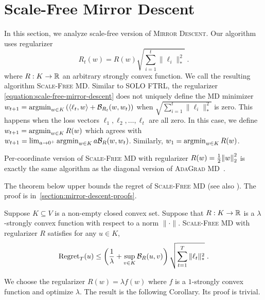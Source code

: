 \section{Scale-Free Mirror Descent}
\label{section:mirror-descent}

In this section, we analyze scale-free version of \textsc{Mirror Descent}.
Our algorithm uses regularizer
\begin{equation}
\label{equation:scale-free-mirror-descent}
R_t(w) = R(w) \sqrt{\sum_{i=1}^t \|\ell_i\|_*^2} \; .
\end{equation}
where $R:K \to \mathbb{R}$ an arbitrary strongly convex function.
We call the resulting algorithm \textsc{Scale-Free MD}.
Similar to \textsc{SOLO FTRL}, the regularizer
\eqref{equation:scale-free-mirror-descent} does not uniquely define
the \textsc{MD} minimizer
$w_{t+1} = \operatorname*{argmin}_{w \in K} \left(\langle \ell_t, w \rangle + \mathcal{B}_{R_t}(w,
w_t) \right)$ when $\sqrt{\sum_{i=1}^t \|\ell_i\|_*^2}$ is zero.
This happens when the loss vectors $\ell_1, \ell_2, \dots, \ell_t$ are all
zero. In this case, we define
$w_{t+1} = \operatorname*{argmin}_{w \in K} R(w)$ which agrees with
$w_{t+1} = \lim_{a \to 0^+} \operatorname*{argmin}_{w \in K} a \mathcal{B}_{R}(w, w_t)$.
Similarly, $w_1 = \operatorname*{argmin}_{w \in K} R(w)$.

Per-coordinate version of \textsc{Scale-Free MD} with regularizer $R(w) =
\frac{1}{2}{\left\|{w}\right\|}_2^2$ is exactly the same algorithm as the diagonal version
of \textsc{AdaGrad MD}~\cite{Duchi-Hazan-Singer-2011}.

The theorem below upper bounds the regret of \textsc{Scale-Free MD} (see also
\cite{Duchi-Hazan-Singer-2011, Duchi-Shalev-Shwartz-Singer-Tewari-2010,
Rakhlin-Sridharan-2013}).  The proof is in~\ref{section:mirror-descent-proofs}.

\begin{theorem}
\label{theorem:regret-scale-free-mirror-descent}
Suppose $K \subseteq V$ is a non-empty closed convex set. Suppose that $R:K
\to \mathbb{R}$ is a $\lambda$-strongly convex function with respect to a norm
$\|\cdot\|$.  \textsc{Scale-Free MD} with regularizer $R$ satisfies
for any $u \in K$,
$$
\operatorname{Regret}_T(u)
\le
\left( \frac{1}{\lambda} + \sup_{v \in K} \mathcal{B}_R(u,v) \right) \sqrt{\sum_{t=1}^T \|\ell_t\|_*^2} \; .
$$
\end{theorem}

We choose the regularizer $R(w) = \lambda f(w)$ where $f$ is a $1$-strongly convex
function and optimize $\lambda$. The result is the following Corollary. Its
proof is trivial.

